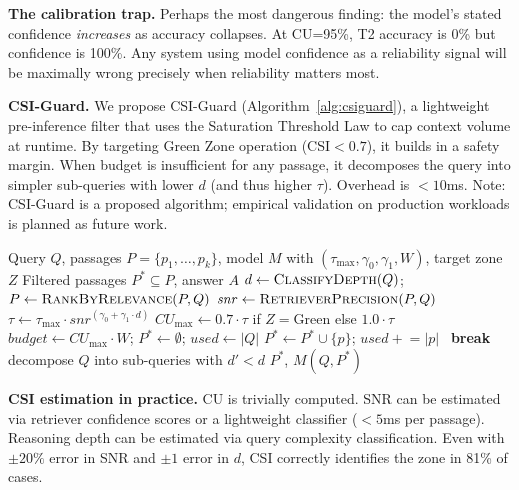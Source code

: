 \documentclass{article}
\begin{document}
\textbf{The calibration trap.} Perhaps the most dangerous finding: the model's stated confidence \emph{increases} as accuracy collapses. At CU=95\%, T2 accuracy is 0\% but confidence is 100\%. Any system using model confidence as a reliability signal will be maximally wrong precisely when reliability matters most.

\textbf{CSI-Guard.} We propose CSI-Guard (Algorithm~\ref{alg:csiguard}), a lightweight pre-inference filter that uses the Saturation Threshold Law to cap context volume at runtime. By targeting Green Zone operation (CSI${<}0.7$), it builds in a safety margin. When budget is insufficient for any passage, it decomposes the query into simpler sub-queries with lower $d$ (and thus higher $\tau$). Overhead is ${<}10$ms. Note: CSI-Guard is a proposed algorithm; empirical validation on production workloads is planned as future work.

\begin{algorithm}[t]
\caption{CSI-Guard: Adaptive Context Management}
\label{alg:csiguard}
\begin{algorithmic}[1]
\Require Query $Q$, passages $P = \{p_1, \ldots, p_k\}$, model $M$ with $(\tau_{\max}, \gamma_0, \gamma_1, W)$, target zone $Z$
\Ensure Filtered passages $P^* \subseteq P$, answer $A$
\State $d \gets \Call{ClassifyDepth}{Q}$; $P \gets \Call{RankByRelevance}{P, Q}$
\State $\mathit{snr} \gets \Call{RetrieverPrecision}{P, Q}$
\State $\tau \gets \tau_{\max} \cdot \mathit{snr}^{(\gamma_0 + \gamma_1 \cdot d)}$
\State $CU_{\max} \gets 0.7 \cdot \tau$ if $Z = \text{Green}$ else $1.0 \cdot \tau$
\State $\mathit{budget} \gets CU_{\max} \cdot W$; $P^* \gets \emptyset$; $\mathit{used} \gets |Q|$
        $P^* \gets P^* \cup \{p\}$; $\mathit{used} \mathrel{+}= |p|$
    \Else~\textbf{break}
    \EndIf
\EndFor
{} decompose $Q$ into sub-queries with $d' < d$
\EndIf
\State \Return $P^*$, $M(Q, P^*)$
\end{algorithmic}
\end{algorithm}

\textbf{CSI estimation in practice.} CU is trivially computed. SNR can be estimated via retriever confidence scores or a lightweight classifier (${<}5$ms per passage). Reasoning depth can be estimated via query complexity classification. Even with $\pm 20\%$ error in SNR and $\pm 1$ error in $d$, CSI correctly identifies the zone in 81\% of cases.

\end{document}
